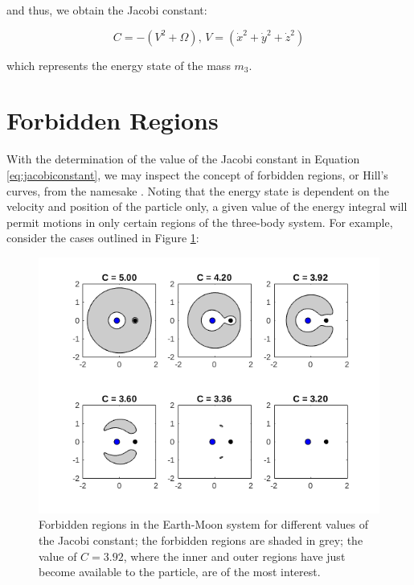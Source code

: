 \noindent and thus, we obtain the Jacobi constant:

\begin{equation}\label{eq:jacobiconstant}
C = - (V^2 + \Omega), \hspace{2pt} V = (\dot{x}^2 + \dot{y}^2 + \dot{z}^2)
\end{equation}

\noindent which represents the energy state of the mass $m_3$. 

\section{Forbidden Regions}

With the determination of the value of the Jacobi constant in Equation \ref{eq:jacobiconstant}, we may inspect the concept of forbidden regions, or Hill's curves, from the namesake \citep{Hill1906}. Noting that the energy state is dependent on the velocity and position of the particle only, a given value of the energy integral will permit motions in only certain regions of the three-body system. For example, consider the cases outlined in Figure \ref{f:jacobiconstants}:


\begin{figure}
\centering
\includegraphics[height=.45\textheight]{figures/jacobiConstantEMSys}
\caption{Forbidden regions in the Earth-Moon system for different values of the Jacobi constant; the forbidden regions are shaded in grey; the value of $C = 3.92$, where the inner and outer regions have just become available to the particle, are of the most interest.}
\label{f:jacobiconstants}
\end{figure}



